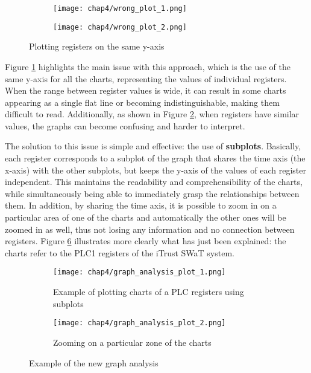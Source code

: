 \begin{figure}[H]
	\centering
	\begin{subfigure}{0.48\textwidth}
		\texttt{[image: chap4/wrong\_plot\_1.png]}
		\caption{}
		\label{subfig:4_wrong_plot}
	\end{subfigure}
	\hfill
	\begin{subfigure}{0.48\textwidth}
		\texttt{[image: chap4/wrong\_plot\_2.png]}
		\caption{}
		\label{subfig:4_wrong_plot_zoom}
	\end{subfigure}
	\caption{Plotting registers on the same y-axis}
	\label{fig:4_plot_comparison_1}
\end{figure}
Figure \ref{subfig:4_wrong_plot} highlights the main issue with this approach, which is the use of the same y-axis for all the charts, representing the values of individual registers. When the range between register values is wide, it can result in some charts appearing as a single flat line or becoming indistinguishable, making them difficult to read. Additionally, as shown in Figure \ref{subfig:4_wrong_plot_zoom}, when registers have similar values, the graphs can become confusing and harder to interpret.

\bigskip
The solution to this issue is simple and effective: the use of \textbf{subplots}. Basically, each register corresponds to a subplot of the graph that shares the time axis (the x-axis) with the other subplots, but keeps the y-axis of the values of each register independent. This maintains the readability and comprehensibility of the charts, while simultaneously being able to immediately grasp the relationships between them. In addition, by sharing the time axis, it is possible to zoom in on a particular area of one of the charts and automatically the other ones will be zoomed in as well, thus not losing any information and no connection between registers. Figure \ref{fig:4_graph_analysis} illustrates more clearly what has just been explained: the charts refer to the PLC1 registers of the iTrust SWaT system.

\begin{figure}[H]
	\centering
	\begin{subfigure}{0.9\textwidth}
		\texttt{[image: chap4/graph\_analysis\_plot\_1.png]}
		\caption{Example of plotting charts of a PLC registers using subplots}
		\label{subfig:4_graph_analysis_1}
	\end{subfigure}
	\hfill
	\begin{subfigure}{0.9\textwidth}
		\texttt{[image: chap4/graph\_analysis\_plot\_2.png]}
		\caption{Zooming on a particular zone of the charts}
		\label{subfig:4_graph_analysis_2}
	\end{subfigure}
	\caption{Example of the new graph analysis}
	\label{fig:4_graph_analysis}
\end{figure}

